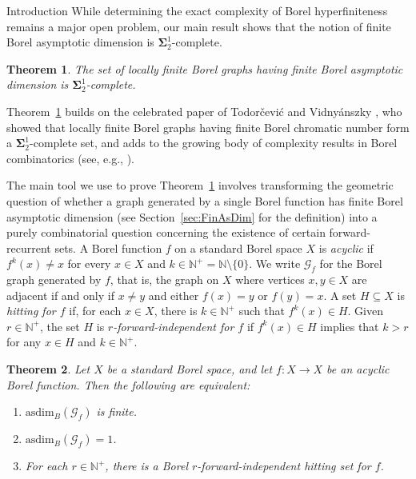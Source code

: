 \documentclass[psamsfonts]{amsart}
\newtheorem{thm}{Theorem}[section]
\theoremstyle{definition}
\newcommand{\N}{\mathbb N}
\newcommand{\asdim}{\text{asdim}}
\theoremstyle{remark}
\numberwithin{equation}{section}
\newcommand\mbf{\mathbf}
\newcommand\mcal{\mathcal}
\begin{document}
\begin{section}{Introduction}
While determining the exact complexity of Borel hyperfiniteness remains a major open problem, our main result shows that the notion of finite Borel asymptotic dimension is $\mbf{\Sigma}^1_2$-complete.

	\begin{thm}
    \label{thm:main}
		The set of locally finite Borel graphs having finite Borel asymptotic dimension is $\mbf{\Sigma}^1_2$-complete.
	\end{thm}

Theorem~\ref{thm:main} builds on the celebrated paper of Todorčević and Vidnyánszky \cite{tv2021}, who showed that locally finite Borel graphs having finite Borel chromatic number form a $\mbf{\Sigma}^1_2$-complete set, and adds to the growing body of complexity results in Borel combinatorics (see, e.g., \cite{bcggrv2021,thornton2022,fsv2024}).

\medskip

The main tool we use to prove Theorem~\ref{thm:main} involves transforming the geometric question of whether a graph generated by a single Borel function has finite Borel asymptotic dimension (see Section~\ref{sec:FinAsDim} for the definition) into a purely combinatorial question concerning the existence of certain forward-recurrent sets.
A Borel function $f$ on a standard Borel space $X$ is \emph{acyclic} if $f^k(x) \neq x$ for every $x \in X$ and $k \in \N^+ = \N \setminus \{0 \}$.
We write $\mcal{G}_f$ for the Borel graph generated by $f$, that is, the graph on $X$ where vertices $x, y \in X$ are adjacent if and only if $x \neq y$ and either $f(x) = y$ or $f(y) = x$.
A set $H \subseteq X$ is {\it hitting for $f$} if, for each $x \in X$, there is $k \in \N^+$ such that $f^k(x) \in H$. Given $r \in \N^+$, the set $H$ is {\it $r$-forward-independent for $f$} if $f^k(x) \in H$ implies that $k > r$ for any $x \in H$ and $k \in \N^+$.

    \begin{thm}\label{thm:EquivalentCharFinAsDim}
        Let $X$ be a standard Borel space, and let $f : X \rightarrow X$ be an acyclic Borel function. Then the following are equivalent:
        \begin{enumerate}
            \item [(i)] $\asdim_B(\mcal{G}_f)$ is finite.
            \item [(ii)] $\asdim_B(\mcal{G}_f)= 1$.
            \item [(iii)] For each $r \in \N^+$, there is a Borel $r$-forward-independent hitting set for $f$.
        \end{enumerate}
    \end{thm}


\end{section}
\end{document}
